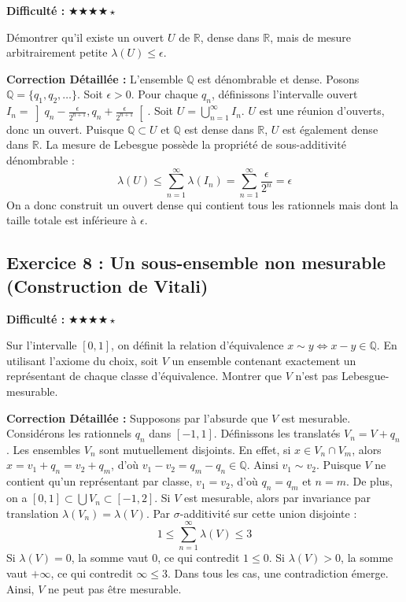 \documentclass[11pt,a4paper]{article}
\begin{document}
\textbf{Difficulté :} $\bigstar\bigstar\bigstar\bigstar\star$

Démontrer qu'il existe un ouvert $U$ de $\mathbb{R}$, dense dans $\mathbb{R}$, mais de mesure arbitrairement petite $\lambda(U) \le \epsilon$.

\textbf{Correction Détaillée :}
L'ensemble $\mathbb{Q}$ est dénombrable et dense. Posons $\mathbb{Q} = \{q_1, q_2, \dots\}$.
Soit $\epsilon > 0$. Pour chaque $q_n$, définissons l'intervalle ouvert $I_n = \left]q_n - \frac{\epsilon}{2^{n+1}}, q_n + \frac{\epsilon}{2^{n+1}}\right[$.
Soit $U = \bigcup_{n=1}^\infty I_n$.
$U$ est une réunion d'ouverts, donc un ouvert. Puisque $\mathbb{Q} \subset U$ et $\mathbb{Q}$ est dense dans $\mathbb{R}$, $U$ est également dense dans $\mathbb{R}$.
La mesure de Lebesgue possède la propriété de sous-additivité dénombrable :
$$\lambda(U) \le \sum_{n=1}^\infty \lambda(I_n) = \sum_{n=1}^\infty \frac{\epsilon}{2^n} = \epsilon$$
On a donc construit un ouvert dense qui contient tous les rationnels mais dont la taille totale est inférieure à $\epsilon$.

\newpage
\subsection*{Exercice 8 : Un sous-ensemble non mesurable (Construction de Vitali)}

\textbf{Difficulté :} $\bigstar\bigstar\bigstar\bigstar\star$

Sur l'intervalle $[0, 1]$, on définit la relation d'équivalence $x \sim y \iff x - y \in \mathbb{Q}$. En utilisant l'axiome du choix, soit $V$ un ensemble contenant exactement un représentant de chaque classe d'équivalence. Montrer que $V$ n'est pas Lebesgue-mesurable.

\textbf{Correction Détaillée :}
Supposons par l'absurde que $V$ est mesurable.
Considérons les rationnels $q_n$ dans $[-1, 1]$. Définissons les translatés $V_n = V + q_n$.
Les ensembles $V_n$ sont mutuellement disjoints. En effet, si $x \in V_n \cap V_m$, alors $x = v_1 + q_n = v_2 + q_m$, d'où $v_1 - v_2 = q_m - q_n \in \mathbb{Q}$. Ainsi $v_1 \sim v_2$. Puisque $V$ ne contient qu'un représentant par classe, $v_1 = v_2$, d'où $q_n = q_m$ et $n = m$.
De plus, on a $[0, 1] \subset \bigcup V_n \subset [-1, 2]$.
Si $V$ est mesurable, alors par invariance par translation $\lambda(V_n) = \lambda(V)$.
Par $\sigma$-additivité sur cette union disjointe :
$$1 \le \sum_{n=1}^\infty \lambda(V) \le 3$$
Si $\lambda(V) = 0$, la somme vaut 0, ce qui contredit $1 \le 0$.
Si $\lambda(V) > 0$, la somme vaut $+\infty$, ce qui contredit $\infty \le 3$.
Dans tous les cas, une contradiction émerge. Ainsi, $V$ ne peut pas être mesurable.
\end{document}
